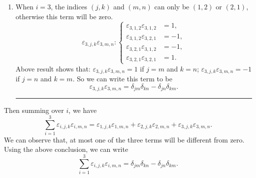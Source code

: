 \documentclass[12pt]{article}
\begin{document}
\begin{enumerate}
\item When $i=3$, the indices $(j,k)$ and $(m,n)$ can only be $(1,2)$ or $(2,1)$, otherwise this term will be zero.
\begin{equation}
\varepsilon_{3,j,k}\varepsilon_{3,m,n} : \begin{cases}
\varepsilon_{3,1,2}\varepsilon_{3,1,2}&=1,\\
\varepsilon_{3,1,2}\varepsilon_{3,2,1}&=-1,\\
\varepsilon_{3,2,1}\varepsilon_{3,1,2}&=-1,\\
\varepsilon_{3,2,1}\varepsilon_{3,2,1}&=1.
\end{cases}
\end{equation}
Above result shows that: $\varepsilon_{3,j,k}\varepsilon_{3,m,n}=1$ if $j=m$ and $k=n$; $\varepsilon_{3,j,k}\varepsilon_{3,m,n}=-1$ if $j=n$ and $k=m$. So we can write this term to be 
\begin{equation}
\varepsilon_{3,j,k}\varepsilon_{3,m,n} = \delta_{jm}\delta_{kn} - \delta_{jn}\delta_{km}.
\end{equation}
\hrule

\end{enumerate}
Then summing over $i$, we have  
\begin{equation}
\sum_{i=1}^{3}\varepsilon_{i,j,k}\varepsilon_{i,m,n} = 
\varepsilon_{1,j,k}\varepsilon_{1,m,n}
+ \varepsilon_{2,j,k}\varepsilon_{2,m,n}
+ \varepsilon_{3,j,k}\varepsilon_{3,m,n}.
\end{equation}
We can observe that, at most one of the three terms will be different from zero. Using the above conclusion, we can write 
\begin{equation}
\sum_{i=1}^{3}\varepsilon_{i,j,k}\varepsilon_{i,m,n} = \delta_{jm}\delta_{kn} - \delta_{jn}\delta_{km}.
\end{equation}
\end{document}
